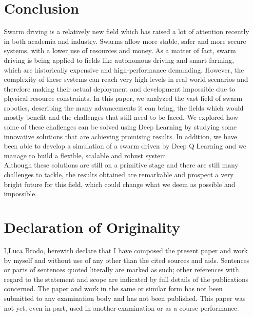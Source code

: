 \documentclass[conference]{IEEEtran}
\begin{document}
\section{Conclusion}
Swarm driving is a relatively new field which has raised a lot of attention recently in both academia and industry. Swarms allow more stable, safer and more secure systems, with a lower use of resources and money. As a matter of fact, swarm driving is being applied to fields like autonomous driving and smart farming, which are historically expensive and high-performance demanding.  
However, the complexity of these systems can reach very high levels in real world scenarios and therefore making their actual deployment and development impossible due to physical resource constraints. 
In this paper, we analyzed the vast field of swarm robotics, describing the many advancements it can bring, the fields which would mostly benefit and the challenges that still need to be faced. We explored how some of these challenges can be solved using Deep Learning by studying some innovative solutions that are achieving promising results. In addition, we have been able to develop a simulation of a swarm driven by Deep Q Learning and we manage to build a flexible, scalable and robust system. \\
Although these solutions are still on a primitive stage and there are still many challenges to tackle, the results obtained are remarkable and prospect a very bright future for this field, which could change what we deem as possible and impossible.\\



\newpage



\section{Declaration of Originality}
I,Luca Brodo, herewith declare that I have composed the present paper and work by myself and without use of any other than the cited sources and aids. Sentences or parts of sentences quoted literally are marked as such; other references with regard to the statement and scope are indicated by full details of the publications concerned. The paper and work in the same or similar form has not been submitted to any examination body and has not been published. This paper was not yet, even in part, used in another examination or as a course performance.
\end{document}
